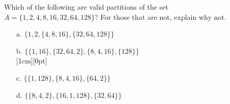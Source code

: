 \documentclass[a4paper,12pt]{book}
\newcounter{question}
\begin{document}
        \begin{questionNOGRADE}{\thequestion}

            Which of the following are valid partitions of the set
            $A = \{1, 2, 4, 8, 16, 32, 64, 128 \}$? For those that
            are not, explain why not.

            \begin{enumerate}
                \item[a.]   $\{ 1, 2, \{4, 8, 16\}, \{32, 64, 128\} \}$

                \item[b.]   $\{ \{1, 16\}, \{32, 64, 2\}, \{8, 4, 16\}, \{ 128 \} \}$
                     { ~\\ \raisebox{0pt}[1cm][0pt]{  } }

                \item[c.]   $\{ \{1, 128\}, \{8, 4, 16\}, \{64, 2\} \}$

                \item[d.]   $\{ \{8, 4, 2\}, \{16, 1, 128\}, \{32, 64\} \}$
            \end{enumerate}

        \end{questionNOGRADE}

        \notonkey{ \newpage }{ \hrulefill }
\end{document}
